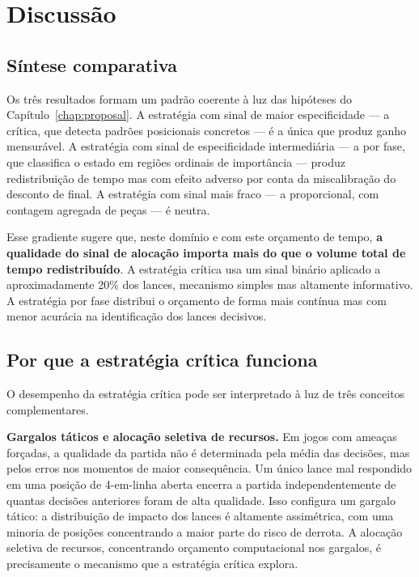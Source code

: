 \documentclass[cic,tc]{iiufrgs}
\begin{document}
\section{Discussão}
\label{sec:results_discussion}

\subsection{Síntese comparativa}
\label{sec:discussion_synthesis}

Os três resultados formam um padrão coerente à luz das hipóteses do Capítulo~\ref{chap:proposal}. A estratégia com sinal de maior especificidade — a crítica, que detecta padrões posicionais concretos — é a única que produz ganho mensurável. A estratégia com sinal de especificidade intermediária — a por fase, que classifica o estado em regiões ordinais de importância — produz redistribuição de tempo mas com efeito adverso por conta da miscalibração do desconto de final. A estratégia com sinal mais fraco — a proporcional, com contagem agregada de peças — é neutra.

Esse gradiente sugere que, neste domínio e com este orçamento de tempo, \textbf{a qualidade do sinal de alocação importa mais do que o volume total de tempo redistribuído}. A estratégia crítica usa um sinal binário aplicado a aproximadamente 20\% dos lances, mecanismo simples mas altamente informativo. A estratégia por fase distribui o orçamento de forma mais contínua mas com menor acurácia na identificação dos lances decisivos.

\subsection{Por que a estratégia crítica funciona}
\label{sec:discussion_critical}

O desempenho da estratégia crítica pode ser interpretado à luz de três conceitos complementares.

\textbf{Gargalos táticos e alocação seletiva de recursos.} Em jogos com ameaças forçadas, a qualidade da partida não é determinada pela média das decisões, mas pelos erros nos momentos de maior consequência. Um único lance mal respondido em uma posição de 4-em-linha aberta encerra a partida independentemente de quantas decisões anteriores foram de alta qualidade. Isso configura um gargalo tático: a distribuição de impacto dos lances é altamente assimétrica, com uma minoria de posições concentrando a maior parte do risco de derrota. A alocação seletiva de recursos, concentrando orçamento computacional nos gargalos, é precisamente o mecanismo que a estratégia crítica explora.
\end{document}
